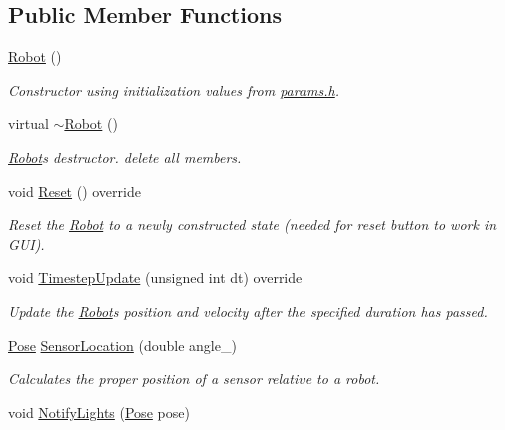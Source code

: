 \subsection*{Public Member Functions}
\begin{DoxyCompactItemize}
\item 
\hyperlink{classRobot_a4fc7c70ae20623f05e06f2ecb388b6c4}{Robot} ()\hypertarget{classRobot_a4fc7c70ae20623f05e06f2ecb388b6c4}{}\label{classRobot_a4fc7c70ae20623f05e06f2ecb388b6c4}

\begin{DoxyCompactList}\small\item\em Constructor using initialization values from \hyperlink{params_8h}{params.\+h}. \end{DoxyCompactList}\item 
virtual \hyperlink{classRobot_abdaab04fa441f06d70a0bcfc731d2e8b}{$\sim$\+Robot} ()\hypertarget{classRobot_abdaab04fa441f06d70a0bcfc731d2e8b}{}\label{classRobot_abdaab04fa441f06d70a0bcfc731d2e8b}

\begin{DoxyCompactList}\small\item\em \hyperlink{classRobot}{Robot}\textquotesingle{}s destructor. {\ttfamily delete} all members. \end{DoxyCompactList}\item 
void \hyperlink{classRobot_af597fd14927d2cd5308ded62f4e54e29}{Reset} () override\hypertarget{classRobot_af597fd14927d2cd5308ded62f4e54e29}{}\label{classRobot_af597fd14927d2cd5308ded62f4e54e29}

\begin{DoxyCompactList}\small\item\em Reset the \hyperlink{classRobot}{Robot} to a newly constructed state (needed for reset button to work in G\+UI). \end{DoxyCompactList}\item 
void \hyperlink{classRobot_ae790462f8782efcfd26082eedec30ed5}{Timestep\+Update} (unsigned int dt) override
\begin{DoxyCompactList}\small\item\em Update the \hyperlink{classRobot}{Robot}\textquotesingle{}s position and velocity after the specified duration has passed. \end{DoxyCompactList}\item 
\hyperlink{structPose}{Pose} \hyperlink{classRobot_a08072df75742df411a6918545724dfaf}{Sensor\+Location} (double angle\+\_\+)
\begin{DoxyCompactList}\small\item\em Calculates the proper position of a sensor relative to a robot. \end{DoxyCompactList}\item 
void \hyperlink{classRobot_a7fddfc5af8351dd12bae975c0570cc0b}{Notify\+Lights} (\hyperlink{structPose}{Pose} pose)\hypertarget{classRobot_a7fddfc5af8351dd12bae975c0570cc0b}{}\label{classRobot_a7fddfc5af8351dd12bae975c0570cc0b}


\end{DoxyCompactItemize}
